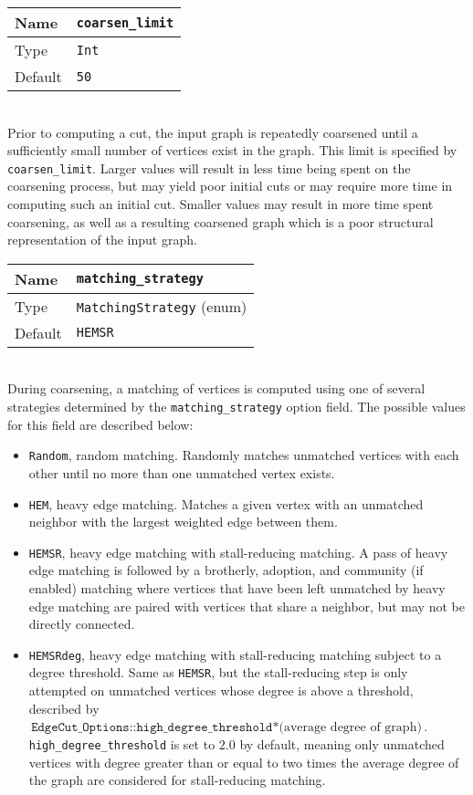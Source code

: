 \documentclass[letter]{article}
\begin{document}
\begin{tabular}{|l|l|} \hline
Name & \texttt{coarsen\_limit} \\ \hline
Type & \texttt{Int} \\ \hline
Default & \texttt{50} \\ \hline
\end{tabular}\\

Prior to computing a cut, the input graph is repeatedly coarsened until a sufficiently small number of vertices exist in the graph. This limit is specified by \texttt{coarsen\_limit}. Larger values will result in less time being spent on the coarsening process, but may yield poor initial cuts or may require more time in computing such an initial cut. Smaller values may result in more time spent coarsening, as well as a resulting coarsened graph which is a poor structural representation of the input graph.

\baselineskip
\begin{tabular}{|l|l|} \hline
Name & \texttt{matching\_strategy} \\ \hline
Type & \texttt{MatchingStrategy} (enum) \\ \hline
Default & \texttt{HEMSR} \\ \hline
\end{tabular}\\

During coarsening, a matching of vertices is computed using one of several strategies determined by the \texttt{matching\_strategy} option field. The possible values for this field are described below:

\begin{itemize}
\item \texttt{Random}, random matching. Randomly matches unmatched vertices with each other until no more than one unmatched vertex exists.
\item \texttt{HEM}, heavy edge matching. Matches a given vertex with an unmatched neighbor with the largest weighted edge between them.
\item \texttt{HEMSR}, heavy edge matching with stall-reducing matching. A pass of heavy edge matching is followed by a brotherly, adoption, and community (if enabled) matching where vertices that have been left unmatched by heavy edge matching are paired with vertices that share a neighbor, but may not be directly connected.
\item \texttt{HEMSRdeg}, heavy edge matching with stall-reducing matching subject to a degree threshold. Same as \texttt{HEMSR}, but the stall-reducing step is only attempted on unmatched vertices whose degree is above a threshold, described by $\texttt{EdgeCut\_Options::high\_degree\_threshold}*\text{(average degree of graph)}$. \texttt{high\_degree\_threshold} is set to $2.0$ by default, meaning only unmatched vertices with degree greater than or equal to two times the average degree of the graph are considered for stall-reducing matching.
\end{itemize}
\end{document}
